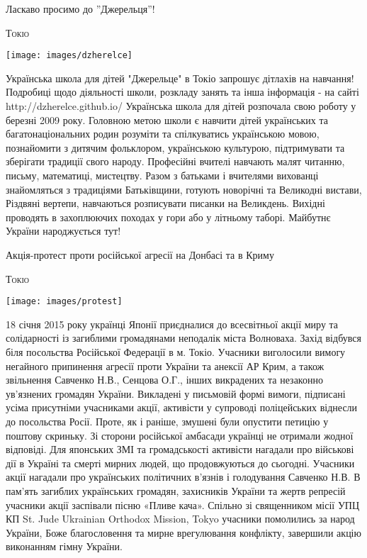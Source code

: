 \documentclass[10pt,a4paper]{article}
\newcommand{\NewsItem}[1]{%
		\usefont{T2A}{iwona}{m}{n} 
		\large #1 \vspace{4pt}
		\par \normalsize \normalfont}
\newcommand{\NewsAuthor}[1]{%
			\hfill \textsc{#1} \vspace{4pt}
			\par \normalfont}
\begin{document}
\begin{multicols}{3}
\NewsItem{Ласкаво просимо до ''Джерельця''!}
\NewsAuthor{Токіо}
		\begin{center}
			\texttt{[image: images/dzherelce]}
		\end{center}
Українська школа для дітей "Джерельце" в Токіо запрошує дітлахів на навчання! Подробиці щодо діяльності школи, розкладу занять та інша інформація - на сайті http://dzherelce.github.io/
Українська школа для дітей розпочала свою роботу у березні 2009 року. Головною метою школи є навчити дітей українських та багатонаціональних родин розуміти та спілкуватись українською мовою, познайомити з дитячим фольклором, українською культурою, підтримувати та зберігати традиції свого народу. Професійні вчителі навчають малят читанню, письму, математиці, мистецтву. Разом з батьками і вчителями вихованці знайомляться з традиціями Батьківщини, готують новорічні та Великодні вистави, Різдвяні вертепи, навчаються розписувати писанки на Великдень. Вихідні проводять в захоплюючих походах у гори або у літньому таборі. Майбутнє України народжується тут!

\vspace{1cm}
\NewsItem{Акція-протест проти російської агресії на Донбасі та в Криму}
\NewsAuthor{Токіо}
		\begin{center}
			\texttt{[image: images/protest]}
		\end{center}
18 січня 2015 року українці Японії приєдналися до всесвітньої акції миру та солідарності із загиблими громадянами неподалік міста Волноваха. Захід відбувся біля посольства Російської Федерації в м. Токіо.
Учасники виголосили вимогу негайного припинення агресії проти України та анексії АР Крим, а також звільнення Савченко Н.В., Сенцова О.Г., інших викрадених та незаконно ув’язнених громадян України. Викладені у письмовій формі вимоги, підписані усіма присутніми учасниками акції, активісти у супроводі поліцейських віднесли до посольства Росії. Проте, як і раніше, змушені були опустити петицію у поштову скриньку. Зі сторони російської амбасади українці не отримали жодної відповіді.
Для японських ЗМІ та громадськості активісти нагадали про військові дії в Україні та смерті мирних людей, що продовжуються до сьогодні. Учасники акції нагадали про українських політичних в’язнів і голодування Савченко Н.В.
В пам’ять загиблих українських громадян, захисників України та жертв репресій учасники акції заспівали пісню «Пливе кача».
Спільно зі священником місії УПЦ КП St. Jude Ukrainian Orthodox Mission, Tokyo учасники помолились за народ України, Боже благословення та мирне врегулювання конфлікту, завершили акцію виконанням гімну України.


\end{multicols}
\end{document}
